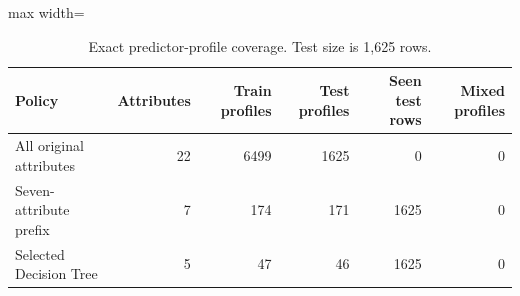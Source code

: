 \begin{table}[H]
\centering\small
\caption{Exact predictor-profile coverage. Test size is 1,625 rows.}
\begin{adjustbox}{max width=\linewidth}\begin{tabular}{lrrrrr}
\toprule
Policy & Attributes & Train profiles & Test profiles & Seen test rows & Mixed profiles \\
\midrule
All original attributes & 22 & 6499 & 1625 & 0 & 0 \\
Seven-attribute prefix & 7 & 174 & 171 & 1625 & 0 \\
Selected Decision Tree & 5 & 47 & 46 & 1625 & 0 \\
\bottomrule
\end{tabular}\end{adjustbox}
\end{table}
